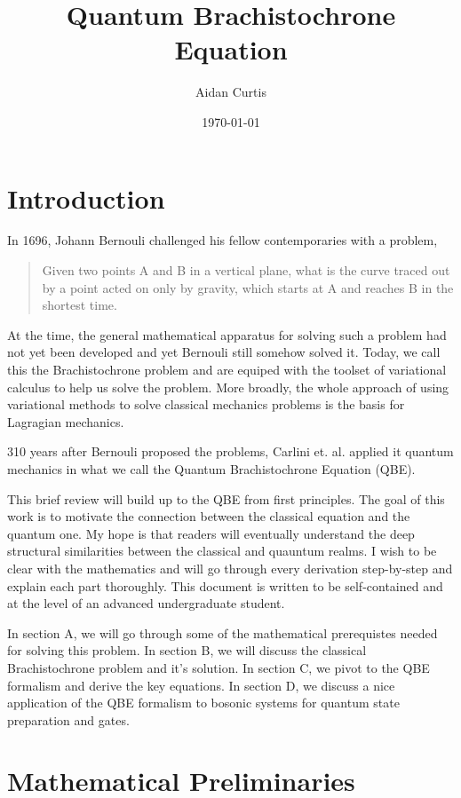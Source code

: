 \documentclass[11pt]{article}
\title{Quantum Brachistochrone Equation}
\author{Aidan Curtis}
\date{\today}
\begin{document}
\maketitle

\section{Introduction}
In 1696, Johann Bernouli challenged his fellow contemporaries with a problem,
\begin{quote}
    Given two points A and B in a vertical plane, what is the curve traced out by a point acted on only by gravity, which starts at A and reaches B in the shortest time.
\end{quote}
At the time, the general mathematical apparatus for solving such a problem had not yet been developed and yet Bernouli still somehow solved it. Today, we call this the Brachistochrone problem and are equiped with the toolset of variational calculus to help us solve the problem. More broadly, the whole approach of using variational methods to solve classical mechanics problems is the basis for Lagragian mechanics.

310 years after Bernouli proposed the problems, Carlini et. al. \cite{carlini2006TimeOptimal} applied it quantum mechanics in what we call the Quantum Brachistochrone Equation (QBE).

This brief review will build up to the QBE from first principles. The goal of this work is to motivate the connection between the classical equation and the quantum one. My hope is that readers will eventually understand the deep structural similarities between the classical and quauntum realms. I wish to be clear with the mathematics and will go through every derivation step-by-step and explain each part thoroughly. This document is written to be self-contained and at the level of an advanced undergraduate student.

In section A, we will go through some of the mathematical prerequistes needed for solving this problem. In section B, we will discuss the classical Brachistochrone problem and it's solution. In section C, we pivot to the QBE formalism and derive the key equations. In section D, we discuss a nice application of the QBE formalism to bosonic systems for quantum state preparation and gates.

\section{Mathematical Preliminaries}
\end{document}
